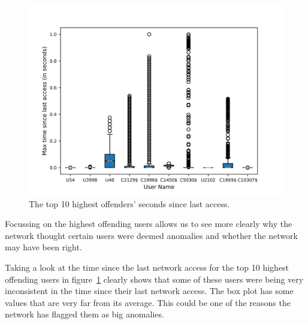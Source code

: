 \begin{figure}
	\begin{center}
		\includegraphics[scale=0.1]{evaluation/highest_offender_time_since_last_access}
	\end{center}
	\caption{The top 10 highest offenders' seconds since last access.~\label{fig:time_since_last_access}}
\end{figure}

Focussing on the highest offending users allows us to see more clearly why the network thought certain users were deemed anomalies and whether the network may have been right.

Taking a look at the time since the last network access for the top 10 highest offending users in figure~\ref{fig:time_since_last_access} clearly shows that some of these users were being very inconsistent in the time since their last network access. The box plot has some values that are very far from its average. This could be one of the reasons the network has flagged them as big anomalies.

